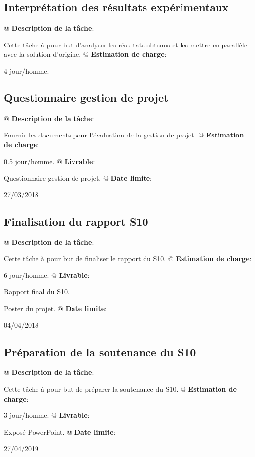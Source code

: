 \documentclass[final]{polytech/polytech}
\begin{document}
		\subsection{Interprétation des résultats expérimentaux}
			\begin{easylist}
				@ \textbf{Description de la tâche}:
				
				Cette tâche à pour but d'analyser les résultats obtenus et les mettre en parallèle avec la solution d'origine.			
				@ \textbf{Estimation de charge}:
				
				4 jour/homme.
			\end{easylist}
			
		\subsection{Questionnaire gestion de projet}
			\begin{easylist}
				@ \textbf{Description de la tâche}:
				
				Fournir les documents pour l'évaluation de la gestion de projet.			
				@ \textbf{Estimation de charge}:
				
				0.5 jour/homme.
				@ \textbf{Livrable}:
				
				Questionnaire gestion de projet.
				@ \textbf{Date limite}:
				
				27/03/2018
			\end{easylist}
			
		\subsection{Finalisation du rapport S10}
			\begin{easylist}
				@ \textbf{Description de la tâche}:
				
				Cette tâche à pour but de finaliser le rapport du S10.			
				@ \textbf{Estimation de charge}:
				
				6 jour/homme.
				@ \textbf{Livrable}:
				
				Rapport final du S10.
				
				Poster du projet.
				@ \textbf{Date limite}:
				
				04/04/2018
			\end{easylist}
			
		\subsection{Préparation de la soutenance du S10}
			\begin{easylist}
				@ \textbf{Description de la tâche}:
				
				Cette tâche à pour but de préparer la soutenance du S10.
				@ \textbf{Estimation de charge}:
				
				3 jour/homme.
				@ \textbf{Livrable}:
				
				Exposé PowerPoint.
				@ \textbf{Date limite}:
				
				27/04/2019
			\end{easylist}
\end{document}
